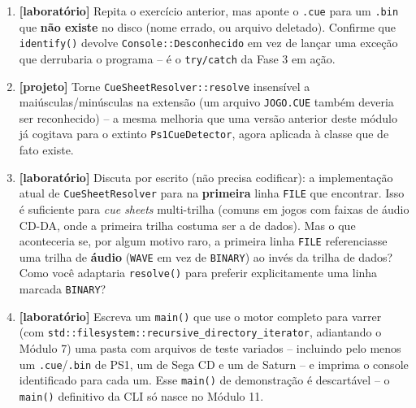 \begin{CaixaDesafio}
\begin{enumerate}[label=\textbf{2.\arabic*}]
    \item \textbf{[laboratório]} Repita o exercício anterior, mas aponte o \texttt{.cue} para um \texttt{.bin} que \textbf{não existe} no disco (nome errado, ou arquivo deletado). Confirme que \texttt{identify()} devolve \texttt{Console::Desconhecido} em vez de lançar uma exceção que derrubaria o programa -- é o \texttt{try/catch} da Fase 3 em ação.
    \item \textbf{[projeto]} Torne \texttt{CueSheetResolver::resolve} insensível a maiúsculas/minúsculas na extensão (um arquivo \texttt{JOGO.CUE} também deveria ser reconhecido) -- a mesma melhoria que uma versão anterior deste módulo já cogitava para o extinto \texttt{Ps1CueDetector}, agora aplicada à classe que de fato existe.
    \item \textbf{[laboratório]} Discuta por escrito (não precisa codificar): a implementação atual de \texttt{CueSheetResolver} para na \textbf{primeira} linha \texttt{FILE} que encontrar. Isso é suficiente para \textit{cue sheets} multi-trilha (comuns em jogos com faixas de áudio CD-DA, onde a primeira trilha costuma ser a de dados). Mas o que aconteceria se, por algum motivo raro, a primeira linha \texttt{FILE} referenciasse uma trilha de \textbf{áudio} (\texttt{WAVE} em vez de \texttt{BINARY}) ao invés da trilha de dados? Como você adaptaria \texttt{resolve()} para preferir explicitamente uma linha marcada \texttt{BINARY}?
    \item \textbf{[laboratório]} Escreva um \texttt{main()} que use o motor completo para varrer (com \texttt{std::filesystem::recursive\_directory\_iterator}, adiantando o Módulo 7) uma pasta com arquivos de teste variados -- incluindo pelo menos um \texttt{.cue}/\texttt{.bin} de PS1, um de Sega CD e um de Saturn -- e imprima o console identificado para cada um. Esse \texttt{main()} de demonstração é descartável -- o \texttt{main()} definitivo da CLI só nasce no Módulo 11.
\end{enumerate}
\end{CaixaDesafio}

